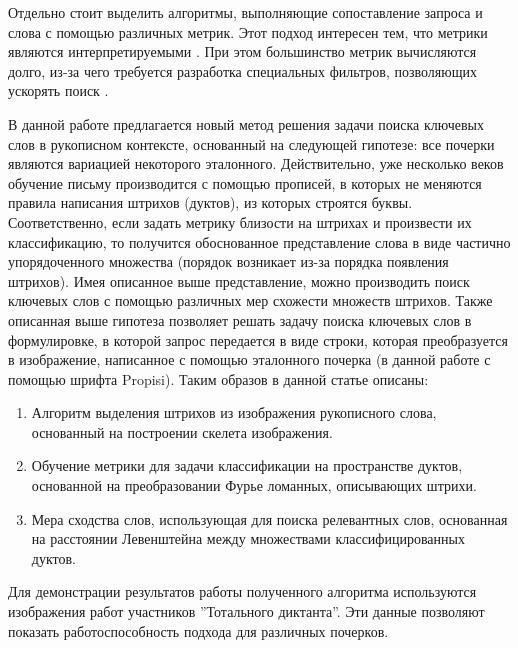 \documentclass{article}
\begin{document}
\par Отдельно стоит выделить алгоритмы, выполняющие сопоставление запроса и слова с помощью различных метрик. Этот подход интересен тем, что метрики являются интерпретируемыми \citep{ameri2017keyword, stauffer2016graph}. При этом большинство метрик вычисляются долго, из-за чего требуется разработка специальных фильтров, позволяющих ускорять поиск \citep{stauffer2020filters}.
\par В данной работе предлагается новый метод решения задачи поиска ключевых слов в рукописном контексте, основанный на следующей гипотезе: все почерки являются вариацией некоторого эталонного. Действительно, уже несколько веков обучение письму производится с помощью прописей, в которых не меняются правила написания штрихов (дуктов), из которых строятся буквы. Соответственно, если задать метрику близости на штрихах и произвести их классификацию, то получится обоснованное представление слова в виде частично упорядоченного множества (порядок возникает из-за порядка появления штрихов). Имея описанное выше представление, можно производить поиск ключевых слов с помощью различных мер схожести множеств штрихов. Также описанная выше гипотеза позволяет решать задачу поиска ключевых слов в формулировке, в которой запрос передается в виде строки, которая преобразуется в изображение, написанное с помощью эталонного почерка (в данной работе с помощью шрифта Propisi). Таким образов в данной статье описаны:
\begin{enumerate}
\item Алгоритм выделения штрихов из изображения рукописного слова, основанный на построении скелета изображения.
\item Обучение метрики для задачи классификации на пространстве дуктов, основанной на преобразовании Фурье ломанных, описывающих штрихи.
\item Мера сходства слов, использующая для поиска релевантных слов, основанная на расстоянии Левенштейна между множествами классифицированных дуктов.
\end{enumerate}
\par Для демонстрации результатов работы полученного алгоритма используются изображения работ участников ''Тотального диктанта''. Эти данные позволяют показать работоспособность подхода для различных почерков.

\end{document}
